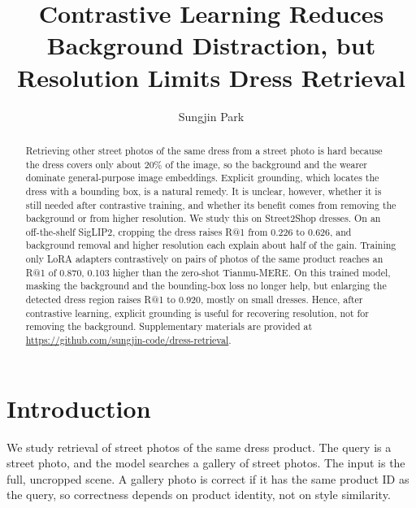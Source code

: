 \documentclass[sigconf,nonacm]{acmart}
\begin{document}
\title[Street-to-Street Dress Image Retrieval]{Contrastive Learning Reduces Background Distraction, but Resolution Limits Dress Retrieval}

\author{Sungjin Park}

\renewcommand{\shortauthors}{Park}

\begin{abstract}
Retrieving other street photos of the same dress from a street photo is hard because the dress covers only about 20\% of the image, so the background and the wearer dominate general-purpose image embeddings. Explicit grounding, which locates the dress with a bounding box, is a natural remedy. It is unclear, however, whether it is still needed after contrastive training, and whether its benefit comes from removing the background or from higher resolution. We study this on Street2Shop dresses. On an off-the-shelf SigLIP2, cropping the dress raises R@1 from 0.226 to 0.626, and background removal and higher resolution each explain about half of the gain. Training only LoRA adapters contrastively on pairs of photos of the same product reaches an R@1 of 0.870, 0.103 higher than the zero-shot Tianmu-MERE. On this trained model, masking the background and the bounding-box loss no longer help, but enlarging the detected dress region raises R@1 to 0.920, mostly on small dresses. Hence, after contrastive learning, explicit grounding is useful for recovering resolution, not for removing the background. Supplementary materials are provided at \url{https://github.com/sungjin-code/dress-retrieval}.
\end{abstract}


\maketitle

\section{Introduction}

We study retrieval of street photos of the same dress product. The query is a street photo, and the model searches a gallery of street photos. The input is the full, uncropped scene. A gallery photo is correct if it has the same product ID as the query, so correctness depends on product identity, not on style similarity.
\end{document}
